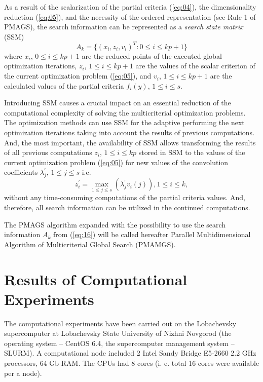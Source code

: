 \documentclass[procedia]{easychair}
\begin{document}
As a result of the scalarization of the partial criteria (\ref{eq:04}), the dimensionality reduction (\ref{eq:05}), and the necessity of the ordered representation (see Rule 1 of PMAGS), the search information can be represented as a {\it search state matrix} (SSM) 
\begin{equation} \label{eq:16}
A_k=\{(x_i,z_i,v_i )^T:0 \leq i \leq kp+1\}
\end{equation} 
where $x_i$, $0 \leq i \leq kp+1$ are the reduced points of the executed global optimization iterations, $z_i$, $1 \leq i \leq kp+1$ are the values of the scalar criterion of the current optimization problem (\ref{eq:05}), and $v_i$, $1 \leq i \leq kp+1$ are the calculated values of the partial criteria $f_i(y)$, $1 \leq i \leq s$. \par

Introducing SSM causes a crucial impact on an essential reduction of the computational complexity of solving the multicriterial optimization problems. The optimization methods can use SSM for the adaptive performing the next optimization iterations taking into account the results of previous computations. And, the most important, the availability of SSM allows transforming the results of all previous computations $z_i$, $1\leq i \leq kp$ stored in SSM to the values of the current optimization problem (\ref{eq:05}) for new values of the convolution coefficients $\lambda^{'}_j$, $1 \leq j \leq s$ i.e.
\begin{equation*}
z^{'}_i=\max_{1 \leq j \leq s}⁡(\lambda^{'}_j v_i(j)),1 \leq i \leq k,
\end{equation*}
without any time-consuming computations of the partial criteria values. And, therefore, all search information can be utilized in the continued computations. \par

The PMAGS algorithm expanded with the possibility to use the search information $A_k$ from (\ref{eq:16}) will be called hereafter Parallel Multidimensional Algorithm of Multicriterial Global Search (PMAMGS).

\section{Results of Computational Experiments}
\label{sect:5}
The computational experiments have been carried out on the Lobachevsky supercomputer at Lobachevsky State University of Nizhni Novgorod (the operating system -- CentOS 6.4, the supercomputer management system -- SLURM). A computational node included 2 Intel Sandy Bridge E5-2660 2.2 GHz processors, 64 Gb RAM. The CPUs had 8 cores (i. e. total 16 cores were available per a node). \par
 
\end{document}
